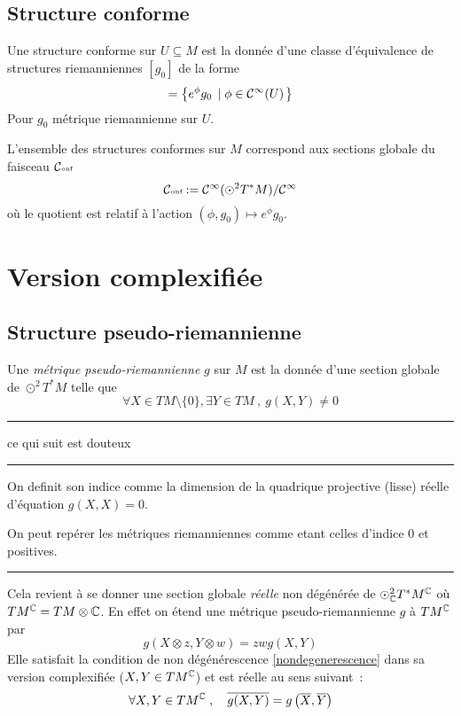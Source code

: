 \documentclass[12pt,makeidx]{amsart}
\DeclareMathOperator\Conf{\Cc\text{\tiny onf}}
\newenvironment{douteux}{%
  \color{Grey}\tiny
  \vspace{.3em}
  \hrule
  \begin{center}{\small ce qui suit est douteux}\end{center}
  \hrule
  \vspace{.4em}
}{%
\vspace{.4em}
\hrule
  \vspace{.3em}
}
\begin{document}
\subsection{Structure conforme}
Une structure conforme sur $U \subseteq M$ est la donnée d'une classe d'équivalence de structures riemanniennes $[g_0]$ de la forme 
\begin{equation}
[g_0] = \ens{e^\phi g_0}{\phi \in \Cc^\infty(U)}
\end{equation}
Pour $g_0$ métrique riemannienne sur $U$.

L'ensemble des structures conformes sur $M$ correspond aux sections globale du faisceau $\Conf$
\[
\Conf := \Cc^\infty(\odot^2 T^*M) / \Cc^\infty
\]
où le quotient est relatif à l'action $(\phi,g_0) \mapsto e^\phi g_0$.

\section{Version complexifiée}
\subsection{Structure pseudo-riemannienne} Une \textit{métrique pseudo-riemannienne} $g$ sur $M$ est la donnée d'une section globale de $\odot^2 T^*M$ telle que
\begin{equation}\label{nondegenerescence}
\forall X \in TM \setminus \{0\}, \exists Y \in TM\ , \ g(X,Y) \neq 0
\end{equation}

\begin{douteux}
On definit son indice comme la dimension de la quadrique projective (lisse) réelle d'équation $g(X,X)=0$.

On peut repérer les métriques riemanniennes comme etant celles d'indice $0$ et positives.
\end{douteux}

Cela revient à se donner une section globale \textit{réelle} non dégénérée de $\odot_{\mathbb{C}}^2 T^*M^{\mathbb{C}}$ où $TM^{\mathbb{C}} = TM \otimes \mathbb{C}$. En effet on étend une métrique pseudo-riemannienne $g$ à $TM^{\mathbb{C}}$ par
\[
g(X \otimes z, Y \otimes w) = zw g(X,Y)
\]
Elle satisfait la condition de non dégénérescence \eqref{nondegenerescence} dans sa version complexifiée ($X,Y \in TM^{\mathbb{C}}$) et est réelle au sens suivant~:
\begin{equation}\label{reel}
\forall X,Y \in TM^{\mathbb{C}}\; ,\quad \overline{g(X,Y)} = g\left(\overline{X},\overline{Y}\right)
\end{equation}
\end{document}
